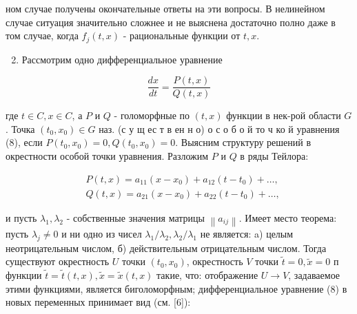 \documentclass[10pt]{article}
\begin{document}
ном случае получены окончательные ответы на эти вопросы. В нелинейном случае ситуация значительно сложнее и не выяснена достаточно полно даже в том случае, когда $f_{j}(t, x)$ - рациональные функции от $t, x$.



\begin{enumerate}

  \setcounter{enumi}{1}

  \item Рассмотрим одно дифференциальное уравнение

\end{enumerate}



\[

\frac{d x}{d t}=\frac{P(t, x)}{Q(t, x)}

\]



где $t \in C, x \in C$, а $P$ и $Q$ - голоморфные по $(t, x)$ функции в нек-рой области $G$. Точка $\left(t_{0}, x_{0}\right) \in G$ наз. (с у щ ес т в ен н о) о с о б о й то ч ко й уравнения (8), если $P\left(t_{0}, x_{0}\right)=0, Q\left(t_{0}, x_{0}\right)=0$. Выясним структуру решений в окрестности особой точки уравнения. Разложим $P$ и $Q$ в ряды Тейлора:



\[

\begin{aligned}

& P(t, x)=a_{11}\left(x-x_{0}\right)+a_{12}\left(t-t_{0}\right)+\ldots, \\

& Q(t, x)=a_{21}\left(x-x_{0}\right)+a_{22}\left(t-t_{0}\right)+\ldots,

\end{aligned}

\]



и пусть $\lambda_{1}, \lambda_{2}$ - собственные значения матрицы $\left\|a_{i j}\right\|$. Имеет место теорема: пусть $\lambda_{j} \neq 0$ и ни одно из чисел $\lambda_{1} / \lambda_{2}, \lambda_{2} / \lambda_{1}$ не является: a) целым неотрицательным числом, б) действительным отрицательным числом. Тогда существуют окрестность $U$ точки $\left(t_{0}, x_{0}\right)$, окрестность $V$ точки $\tilde{t}=0, \tilde{x}=0$ п функции $\tilde{t}=\tilde{t}(t, x), \tilde{x}=\tilde{x}(t, x)$ такие, что: отображение $U \rightarrow V$, задаваемое этими функциями, является биголоморфным; дифференциальное уравнение (8) в новых переменных принимает вид (см. [6]):
\end{document}
